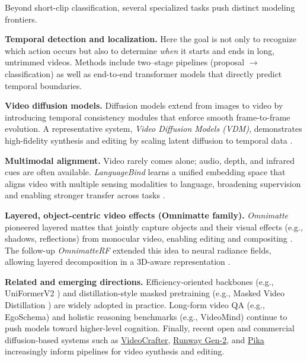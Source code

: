 \begin{enrichment}
    \label{enr:sec_chapter24_specialized}
    
    Beyond short-clip classification, several specialized tasks push distinct modeling frontiers.
    
    \medskip
    \noindent\textbf{Temporal detection and localization.}
    Here the goal is not only to recognize which action occurs but also to determine \emph{when} it starts and ends in long, untrimmed videos. Methods include two--stage pipelines (proposal $\rightarrow$ classification) as well as end-to-end transformer models that directly predict temporal boundaries.
    
    \medskip
    \noindent\textbf{Video diffusion models.}
    Diffusion models extend from images to video by introducing temporal consistency modules that enforce smooth frame-to-frame evolution. A representative system, \emph{Video Diffusion Models (VDM)}, demonstrates high-fidelity synthesis and editing by scaling latent diffusion to temporal data \cite{blattmann2023_vdm}.
    
    \medskip
    \noindent\textbf{Multimodal alignment.}
    Video rarely comes alone; audio, depth, and infrared cues are often available. \emph{LanguageBind} learns a unified embedding space that aligns video with multiple sensing modalities to language, broadening supervision and enabling stronger transfer across tasks \cite{xu2023_languagebind}.
    
    \medskip
    \noindent\textbf{Layered, object-centric video effects (Omnimatte family).}
    \emph{Omnimatte} pioneered layered mattes that jointly capture objects and their visual effects (e.g., shadows, reflections) from monocular video, enabling editing and compositing \cite{lu2021_omnimatte}. The follow-up \emph{OmnimatteRF} extended this idea to neural radiance fields, allowing layered decomposition in a 3D-aware representation \cite{lu2023_omnimatterf}.
    
    \medskip
    \noindent\textbf{Related and emerging directions.}
    Efficiency-oriented backbones (e.g., UniFormerV2 \cite{li2022_uniformerv2}) and distillation-style masked pretraining (e.g., Masked Video Distillation \cite{wang2023_mvd}) are widely adopted in practice. Long-form video QA (e.g., EgoSchema) and holistic reasoning benchmarks (e.g., VideoMind) continue to push models toward higher-level cognition. Finally, recent open and commercial diffusion-based systems such as \href{https://videocrafter.github.io/}{VideoCrafter}, \href{https://runwayml.com/gen2}{Runway Gen-2}, and \href{https://pika.art}{Pika} increasingly inform pipelines for video synthesis and editing.
    
\end{enrichment}
